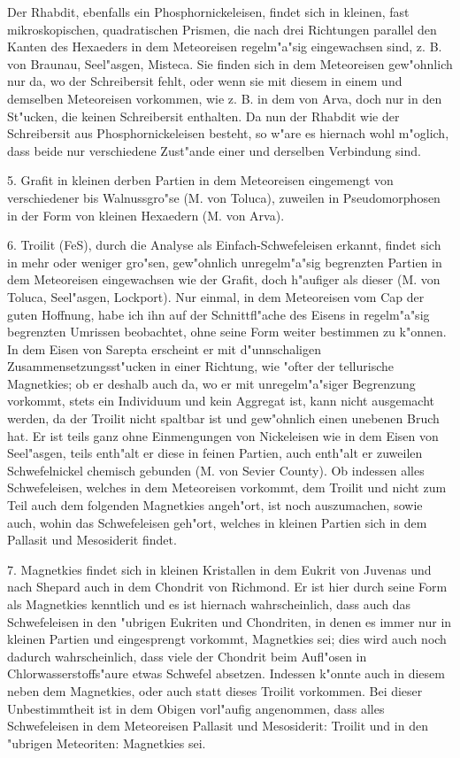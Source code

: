 \documentclass[a4paper, 11pt, oneside]{article}
\begin{document}
Der Rhabdit, ebenfalls ein Phosphornickeleisen, findet sich in kleinen, fast mikroskopischen, quadratischen Prismen, die nach drei Richtungen parallel den Kanten des Hexaeders in dem Meteoreisen regelm"a"sig eingewachsen sind, z. B. von Braunau, Seel"asgen, Misteca. Sie finden sich in dem Meteoreisen gew"ohnlich nur da, wo der Schreibersit fehlt, oder wenn sie mit diesem in einem und demselben Meteoreisen vorkommen, wie z. B. in dem von Arva, doch nur in den St"ucken, die keinen Schreibersit enthalten. Da nun der Rhabdit wie der Schreibersit aus Phosphornickeleisen besteht, so w"are es hiernach wohl m"oglich, dass beide nur verschiedene Zust"ande einer und derselben Verbindung sind.

5. Grafit in kleinen derben Partien in dem Meteoreisen eingemengt von verschiedener bis Walnussgro"se (M. von Toluca), zuweilen in Pseudomorphosen in der Form von kleinen Hexaedern (M. von Arva).

6. Troilit (FeS), durch die Analyse als Einfach-Schwefeleisen erkannt, findet sich in mehr oder weniger gro"sen, gew"ohnlich unregelm"a"sig begrenzten Partien in dem Meteoreisen eingewachsen wie der Grafit, doch h"aufiger als dieser (M. von Toluca, Seel"asgen, Lockport). Nur einmal, in dem Meteoreisen vom Cap der guten Hoffnung, habe ich ihn auf der Schnittfl"ache des Eisens in regelm"a"sig begrenzten Umrissen beobachtet, ohne seine Form weiter bestimmen zu k"onnen. In dem Eisen von Sarepta erscheint er mit d"unnschaligen Zusammensetzungsst"ucken in einer Richtung, wie "ofter der tellurische Magnetkies; ob er deshalb auch da, wo er mit unregelm"a"siger Begrenzung vorkommt, stets ein Individuum und kein Aggregat ist, kann nicht ausgemacht werden, da der Troilit nicht spaltbar ist und gew"ohnlich einen unebenen Bruch hat. Er ist teils ganz ohne Einmengungen von Nickeleisen wie in dem Eisen von Seel"asgen, teils enth"alt er diese in feinen Partien, auch enth"alt er zuweilen Schwefelnickel chemisch gebunden (M. von Sevier County). Ob indessen alles Schwefeleisen, welches in dem Meteoreisen vorkommt, dem Troilit und nicht zum Teil auch dem folgenden Magnetkies angeh"ort, ist noch auszumachen, sowie auch, wohin das Schwefeleisen geh"ort, welches in kleinen Partien sich in dem Pallasit und Mesosiderit findet.

7. Magnetkies findet sich in kleinen Kristallen in dem Eukrit von Juvenas und nach Shepard auch in dem Chondrit von Richmond. Er ist hier durch seine Form als Magnetkies kenntlich und es ist hiernach wahrscheinlich, dass auch das Schwefeleisen in den "ubrigen Eukriten und Chondriten, in denen es immer nur in kleinen Partien und eingesprengt vorkommt, Magnetkies sei; dies wird auch noch dadurch wahrscheinlich, dass viele der Chondrit beim Aufl"osen in Chlorwasserstoffs"aure etwas Schwefel absetzen. Indessen k"onnte auch in diesem neben dem Magnetkies, oder auch statt dieses Troilit vorkommen. Bei dieser Unbestimmtheit ist in dem Obigen vorl"aufig angenommen, dass alles Schwefeleisen in dem Meteoreisen Pallasit und Mesosiderit: Troilit und in den "ubrigen Meteoriten: Magnetkies sei.
\end{document}

